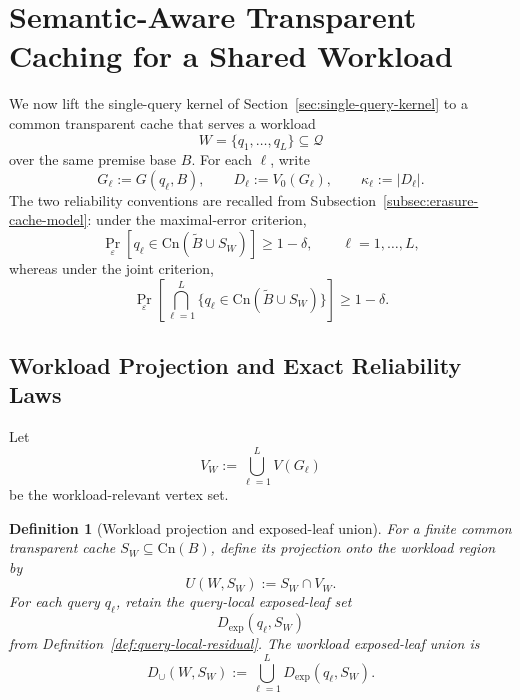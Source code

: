 \documentclass[journal]{IEEEtran}
\newcommand{\Cn}{\text{Cn}}
\newtheorem{definition}{Definition}[section]
\numberwithin{equation}{section}
\begin{document}
\section{Semantic-Aware Transparent Caching for a Shared Workload}
\label{sec:semantic-scenario}

We now lift the single-query kernel of
Section~\ref{sec:single-query-kernel} to a common transparent cache that
serves a workload
\[
  W=\{q_1,\ldots,q_L\}\subseteq\mathcal Q
\]
over the same premise base \(B\).  For each \(\ell\), write
\[
  G_\ell:=G(q_\ell,B),
  \qquad
  D_\ell:=V_0(G_\ell),
  \qquad
  \kappa_\ell:=|D_\ell|.
\]
The two reliability conventions are recalled from
Subsection~\ref{subsec:erasure-cache-model}: under the maximal-error
criterion,
\[
  \Pr_\varepsilon\!\left[
    q_\ell\in\Cn(\widetilde B\cup S_W)
  \right]
  \ge 1-\delta,
  \qquad \ell=1,\ldots,L,
\]
whereas under the joint criterion,
\[
  \Pr_\varepsilon\!\left[
    \bigcap_{\ell=1}^{L}
    \{q_\ell\in\Cn(\widetilde B\cup S_W)\}
  \right]
  \ge 1-\delta.
\]

\subsection{Workload Projection and Exact Reliability Laws}
\label{subsec:workload-exact-laws}

Let
\[
  V_W
  :=
  \bigcup_{\ell=1}^{L}V(G_\ell)
\]
be the workload-relevant vertex set.

\begin{definition}[Workload projection and exposed-leaf union]
\label{def:workload-projection}
For a finite common transparent cache \(S_W\subseteq\Cn(B)\), define its
projection onto the workload region by
\begin{equation}
  U(W,S_W):=S_W\cap V_W.
\label{eq:workload-projection}
\end{equation}
For each query \(q_\ell\), retain the query-local exposed-leaf set
\[
  D_{\mathrm{exp}}(q_\ell,S_W)
\]
from Definition~\ref{def:query-local-residual}.  The workload exposed-leaf
union is
\begin{equation}
  D_{\cup}(W,S_W)
  :=
  \bigcup_{\ell=1}^{L}D_{\mathrm{exp}}(q_\ell,S_W).
\label{eq:workload-exposed-union}
\end{equation}
\end{definition}
\end{document}
